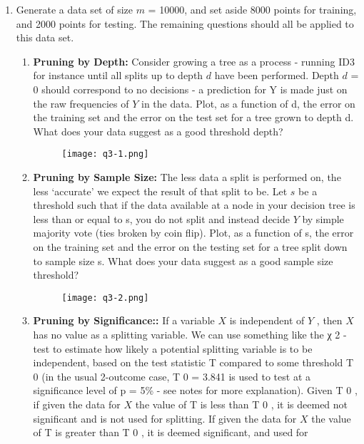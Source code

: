\documentclass[letter, 12pt]{article}
\begin{document}
\begin{enumerate}
        \item{Generate a data set of size $ m $ = 10000, and set aside 8000 points for training, and 2000 points for testing. The
        	remaining questions should all be applied to this data set.}
        \begin{enumerate}
        	\item {\textbf{Pruning by Depth:} Consider growing a tree as a process - running ID3 for instance until all splits
        		up to depth $ d $ have been performed. Depth $ d $ = 0 should correspond to no decisions - a prediction for Y
        		is made just on the raw frequencies of $ Y $ in the data. Plot, as a function of d, the error on the training
        		set and the error on the test set for a tree grown to depth d. What does your data suggest as a good
        		threshold depth?}
        	\begin{figure}[H]
        		\centering
        		\texttt{[image: q3-1.png]}
        	\end{figure}
        	\item {\textbf{Pruning by Sample Size:} The less data a split is performed on, the less `accurate' we expect the
        		result of that split to be. Let $ s $ be a threshold such that if the data available at a node in your decision
        		tree is less than or equal to s, you do not split and instead decide $ Y $ by simple majority vote (ties broken
        		by coin flip). Plot, as a function of s, the error on the training set and the error on the testing set for a
        		tree split down to sample size s. What does your data suggest as a good sample size threshold?}
        	\begin{figure}[H]
        		\centering
        		\texttt{[image: q3-2.png]}
        	\end{figure}
        	\item {\textbf{Pruning by Significance::} If a variable $ X $ is independent of $ Y $ , then $ X $ has no value as a splitting
        		variable. We can use something like the χ 2 -test to estimate how likely a potential splitting variable is
        		to be independent, based on the test statistic T compared to some threshold T 0 (in the usual 2-outcome
        		case, T 0 = 3.841 is used to test at a significance level of p = 5\% - see notes for more explanation). Given
        		T 0 , if given the data for $ X $ the value of T is less than T 0 , it is deemed not significant and is not used for
        		splitting. If given the data for $ X $ the value of T is greater than T 0 , it is deemed significant, and used for
}
\end{enumerate}
\end{enumerate}
\end{document}
